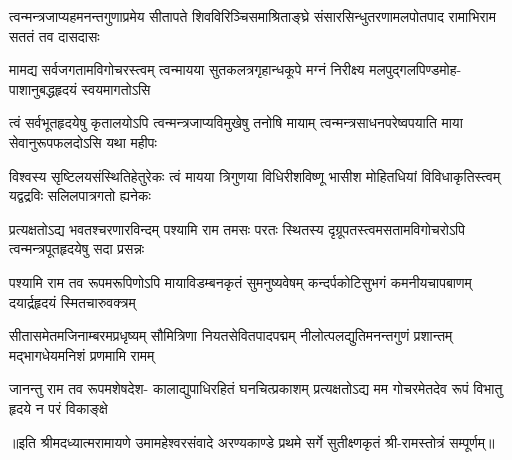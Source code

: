 


\addtocounter{shlokacount}{26}

\fourlineindentedshloka
{त्वन्मन्त्रजाप्यहमनन्तगुणाप्रमेय}
{सीतापते शिवविरिञ्चिसमाश्रिताङ्घ्रे}
{संसारसिन्धुतरणामलपोतपाद}
{रामाभिराम सततं तव दासदासः} %

\fourlineindentedshloka
{मामद्य सर्वजगतामविगोचरस्त्वम्}
{त्वन्मायया सुतकलत्रगृहान्धकूपे}
{मग्नं निरीक्ष्य मलपुद्गलपिण्डमोह-}
{पाशानुबद्धहृदयं स्वयमागतोऽसि} %

\fourlineindentedshloka
{त्वं सर्वभूतहृदयेषु कृतालयोऽपि}
{त्वन्मन्त्रजाप्यविमुखेषु तनोषि मायाम्}
{त्वन्मन्त्रसाधनपरेष्वपयाति माया}
{सेवानुरूपफलदोऽसि यथा महीपः} %

\fourlineindentedshloka
{विश्वस्य सृष्टिलयसंस्थितिहेतुरेकः}
{त्वं मायया त्रिगुणया विधिरीशविष्णू}
{भासीश मोहितधियां विविधाकृतिस्त्वम्}
{यद्वद्रविः सलिलपात्रगतो ह्यनेकः} %

\fourlineindentedshloka
{प्रत्यक्षतोऽद्य भवतश्चरणारविन्दम्}
{पश्यामि राम तमसः परतः स्थितस्य}
{दृग्रूपतस्त्वमसतामविगोचरोऽपि}
{त्वन्मन्त्रपूतहृदयेषु सदा प्रसन्नः} %

\fourlineindentedshloka
{पश्यामि राम तव रूपमरूपिणोऽपि}
{मायाविडम्बनकृतं सुमनुष्यवेषम्}
{कन्दर्पकोटिसुभगं कमनीयचापबाणम्}
{दयार्द्रहृदयं स्मितचारुवक्त्रम्} %

\fourlineindentedshloka
{सीतासमेतमजिनाम्बरमप्रधृष्यम्}
{सौमित्रिणा नियतसेवितपादपद्मम्}
{नीलोत्पलद्युतिमनन्तगुणं प्रशान्तम्}
{मद्भागधेयमनिशं प्रणमामि रामम्} %

\fourlineindentedshloka
{जानन्तु राम तव रूपमशेषदेश-}
{कालाद्युपाधिरहितं घनचित्प्रकाशम्}
{प्रत्यक्षतोऽद्य मम गोचरमेतदेव}
{रूपं विभातु हृदये न परं विकाङ्क्षे} %

{॥इति श्रीमदध्यात्मरामायणे उमामहेश्वरसंवादे अरण्यकाण्डे
प्रथमे सर्गे सुतीक्ष्णकृतं श्री-रामस्तोत्रं सम्पूर्णम्॥}
